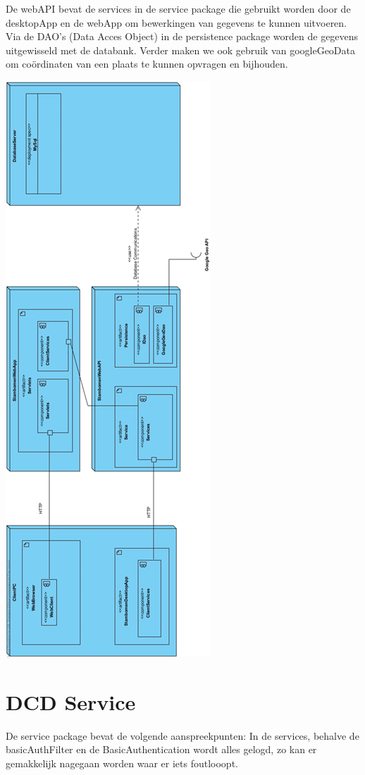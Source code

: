 \documentclass[pdftex,a4paper,12pt,twoside]{report}
\begin{document}
De webAPI bevat de services in de service package die gebruikt worden door de desktopApp en de webApp om bewerkingen van gegevens te kunnen uitvoeren. Via de DAO’s (Data Acces Object) in de persistence package worden de gegevens uitgewisseld met de databank.
Verder maken we ook gebruik van googleGeoData om coördinaten van een plaats te kunnen opvragen en bijhouden.
\begin{center}
\includegraphics[height=\textheight]{images/deploymentdiagram.png}\\
\end{center}

\section{DCD Service}
De service package bevat de volgende aanspreekpunten:
In de services, behalve de basicAuthFilter en de BasicAuthentication wordt alles gelogd, zo kan er gemakkelijk nagegaan worden waar er iets foutlooopt.
\end{document}
